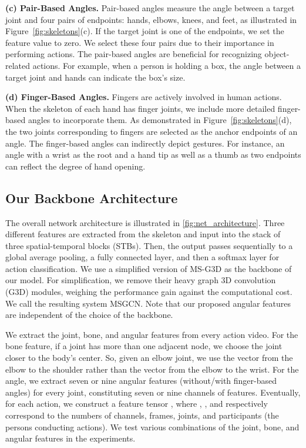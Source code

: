 \documentclass[journal,comsoc]{IEEEtran}
\def\ourmodel{MSGCN}
\begin{document}
\textbf{(c) Pair-Based Angles.} Pair-based angles measure the angle between a target joint and four pairs of endpoints: hands, elbows, knees, and feet, as illustrated in Figure~\ref{fig:skeletons}(c).
If the target joint is one of the endpoints, we set the feature value to zero. We select these four pairs due to their importance in performing actions. The pair-based angles are beneficial for recognizing object-related actions. For example, when a person is holding a box, the angle between a target joint and hands can indicate the box's size.

\textbf{(d) Finger-Based Angles.} 
Fingers are actively involved in human actions.
When the skeleton of each hand has finger joints,
we include more detailed finger-based angles to incorporate them.
As demonstrated in Figure~\ref{fig:skeletons}(d), the two joints corresponding to fingers are selected as the anchor endpoints of an angle. The finger-based angles can indirectly depict gestures. For instance, 
an angle with a wrist as the root and a hand tip as well as a thumb as two endpoints can reflect the degree of hand opening. 

\subsection{Our Backbone Architecture}
\label{sec: angnet}
The overall network architecture is illustrated in \autoref{fig:net_architecture}. 
Three different features are extracted from the skeleton and input into the stack of three spatial-temporal blocks (STBs). Then, the output passes sequentially to a global average pooling, a fully connected layer, and then a softmax layer for action classification. We use a simplified version of MS-G3D \cite{liu2020disentangling} as the backbone of our model. 
For simplification, we remove their heavy graph 3D convolution (G3D) modules, weighing the performance gain against the computational cost. 
We call the resulting system \ourmodel{}. Note that our proposed angular features are independent of the choice of the backbone. 

We extract the joint, bone, and angular features from every action video. For the bone feature, if a joint has more than one adjacent node, we choose the joint closer to the body's center. So, given an elbow joint, we use the vector from the elbow to the shoulder rather than the vector from the elbow to the wrist. For the angle, we extract seven or nine angular features (without/with finger-based angles) for every joint, constituting seven or nine channels of features. Eventually, for each action, we construct a feature tensor , where , ,  and  respectively correspond to the numbers of channels, frames, joints, and participants (the persons conducting actions). We test various combinations of the joint, bone, and angular features in the experiments. 
\end{document}
